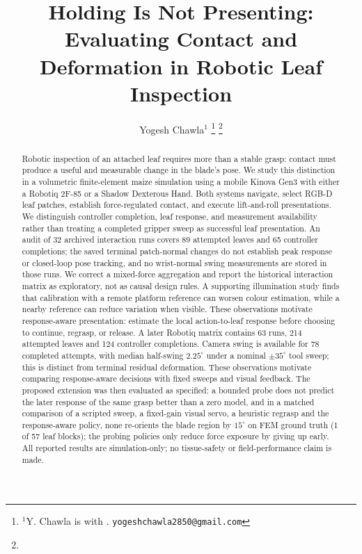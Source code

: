 \documentclass[letterpaper, 10 pt, conference]{ieeeconf}
\title{\LARGE \bf
Holding Is Not Presenting: Evaluating Contact and Deformation in Robotic Leaf Inspection}
\author{Yogesh Chawla$^{1}$%
\thanks{$^{1}$Y. Chawla is with \todo{affiliation}. {\tt\small yogeshchawla2850@gmail.com}}%
\thanks{\todo{Add co-authors, affiliations and funding.}}%
}
\begin{document}
\maketitle
\thispagestyle{empty}
\pagestyle{empty}

\begin{abstract}
Robotic inspection of an attached leaf requires more than a stable grasp: contact must
produce a useful and measurable change in the blade's pose. We study this distinction in
a volumetric finite-element maize simulation using a mobile Kinova Gen3 with either a
Robotiq 2F-85 or a Shadow Dexterous Hand. Both systems navigate, select RGB-D leaf
patches, establish force-regulated contact, and execute lift-and-roll presentations.
We distinguish controller completion, leaf response, and measurement availability rather
than treating a completed gripper sweep as successful leaf presentation. An audit of 32
archived interaction runs covers 89 attempted leaves and 65 controller completions; the
saved terminal patch-normal changes do not establish peak response or closed-loop pose
tracking, and no wrist-normal swing measurements are stored in those runs. We correct a
mixed-force aggregation and report the historical interaction matrix as exploratory,
not as causal design rules. A supporting illumination study finds that calibration with a
remote platform reference can worsen colour estimation, while a nearby reference can
reduce variation when visible. These observations motivate response-aware presentation:
estimate the local action-to-leaf response before choosing to continue, regrasp, or release.
A later Robotiq matrix contains 63 runs, 214 attempted leaves and 124 controller
completions. Camera swing is available for 78 completed attempts, with median half-swing
$2.25^\circ$ under a nominal $\pm35^\circ$ tool sweep; this is distinct from terminal
residual deformation. These observations motivate comparing response-aware decisions with
fixed sweeps and visual feedback. The proposed extension was then evaluated as specified: a bounded probe does not predict
the later response of the same grasp better than a zero model, and in a matched comparison
of a scripted sweep, a fixed-gain visual servo, a heuristic regrasp and the response-aware
policy, none re-orients the blade region by $15^\circ$ on FEM ground truth (1 of 57 leaf
blocks); the probing policies only reduce force exposure by giving up early. All
reported results are simulation-only; no tissue-safety or field-performance claim is made.
\end{abstract}
\end{document}
